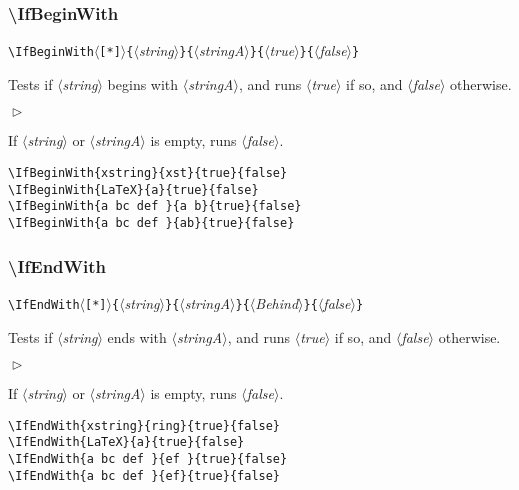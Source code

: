 \documentclass[a4paper,10pt]{article}
\newcommand\argu[1]{$\langle$\textit{#1}$\rangle$}
\newcommand\ARGU[1]{\texttt{\{}\argu{#1}\texttt{\}}}
\newcommand\etoile{$\langle$\texttt{[*]}$\rangle$}
\newenvironment{Conditions}[1][1cm]%
{\begin{list}%
	{$\vartriangleright$}%
	{\setlength{\leftmargin}{#1}
	 \setlength{\itemsep}{0pt}
	 \setlength{\parsep}{0pt}
	 \setlength{\topsep}{2ptplus3ptminus2pt}
	}}%
{\end{list}}
\newcommand\styleexemple{\small\vskip4pt}
\newcommand\verbinline{\lstinline[basicstyle=\normalsize\ttfamily]}
\begin{document}
\subsubsection{\ttfamily\textbackslash IfBeginWith}

\verbinline|\IfBeginWith|\etoile\ARGU{string}\ARGU{stringA}\ARGU{true}\ARGU{false}
\smallskip

Tests if \argu{string} begins with \argu{stringA}, and runs \argu{true} if so, and \argu{false} otherwise.\medskip

\begin{Conditions}
\item If \argu{string} or \argu{stringA} is empty, runs \argu{false}.
\end{Conditions}

\begin{minipage}[t]{0.65\linewidth}
\begin{lstlisting}
\IfBeginWith{xstring}{xst}{true}{false}
\IfBeginWith{LaTeX}{a}{true}{false}
\IfBeginWith{a bc def }{a b}{true}{false}
\IfBeginWith{a bc def }{ab}{true}{false}
\end{lstlisting}%
\end{minipage}\hfill
\begin{minipage}[t]{0.35\linewidth}
	\styleexemple
	\par
	\par
	\par
\end{minipage}%

\subsubsection{\ttfamily\textbackslash IfEndWith}

\verbinline|\IfEndWith|\etoile\ARGU{string}\ARGU{stringA}\ARGU{Behind}\ARGU{false}
\smallskip

Tests if \argu{string} ends with \argu{stringA}, and runs \argu{true} if so, and \argu{false} otherwise.\medskip

\begin{Conditions}
\item If \argu{string} or \argu{stringA} is empty, runs \argu{false}.
\end{Conditions}

\begin{minipage}[t]{0.65\linewidth}
\begin{lstlisting}
\IfEndWith{xstring}{ring}{true}{false}
\IfEndWith{LaTeX}{a}{true}{false}
\IfEndWith{a bc def }{ef }{true}{false}
\IfEndWith{a bc def }{ef}{true}{false}
\end{lstlisting}%
\end{minipage}\hfill
\begin{minipage}[t]{0.35\linewidth}
	\styleexemple
	\par
	\par
	\par
\end{minipage}%
\end{document}
